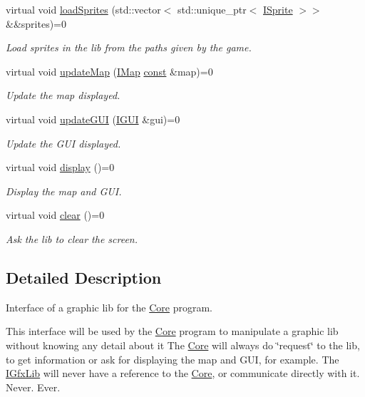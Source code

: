 \begin{DoxyCompactItemize}
virtual void \hyperlink{classarcade_1_1_i_gfx_lib_a1cdbd2504ca685f10ea2af3cd26a9f5a}{load\-Sprites} (std\-::vector$<$ std\-::unique\-\_\-ptr$<$ \hyperlink{classarcade_1_1_i_sprite}{I\-Sprite} $>$$>$ \&\&sprites)=0
\begin{DoxyCompactList}\small\item\em Load sprites in the lib from the paths given by the game. \end{DoxyCompactList}\item 
virtual void \hyperlink{classarcade_1_1_i_gfx_lib_addc883f69b75e6ec4927027aad94f5b5}{update\-Map} (\hyperlink{classarcade_1_1_i_map}{I\-Map} \hyperlink{term__entry_8h_a57bd63ce7f9a353488880e3de6692d5a}{const} \&map)=0
\begin{DoxyCompactList}\small\item\em Update the map displayed. \end{DoxyCompactList}\item 
virtual void \hyperlink{classarcade_1_1_i_gfx_lib_ae3f443cc341512433815e8bf2dee3e0d}{update\-G\-U\-I} (\hyperlink{classarcade_1_1_i_g_u_i}{I\-G\-U\-I} \&gui)=0
\begin{DoxyCompactList}\small\item\em Update the G\-U\-I displayed. \end{DoxyCompactList}\item 
virtual void \hyperlink{classarcade_1_1_i_gfx_lib_a7f280525c718a44c1e05cfe0ba5304c3}{display} ()=0
\begin{DoxyCompactList}\small\item\em Display the map and G\-U\-I. \end{DoxyCompactList}\item 
virtual void \hyperlink{classarcade_1_1_i_gfx_lib_a4116b3d4f503c4a795539b584f77a73d}{clear} ()=0
\begin{DoxyCompactList}\small\item\em Ask the lib to clear the screen. \end{DoxyCompactList}\end{DoxyCompactItemize}


\subsection{Detailed Description}
Interface of a graphic lib for the \hyperlink{classarcade_1_1_core}{Core} program. 

This interface will be used by the \hyperlink{classarcade_1_1_core}{Core} program to manipulate a graphic lib without knowing any detail about it The \hyperlink{classarcade_1_1_core}{Core} will always do \char`\"{}request\char`\"{} to the lib, to get information or ask for displaying the map and G\-U\-I, for example. The \hyperlink{classarcade_1_1_i_gfx_lib}{I\-Gfx\-Lib} will never have a reference to the \hyperlink{classarcade_1_1_core}{Core}, or communicate directly with it. Never. Ever. 


